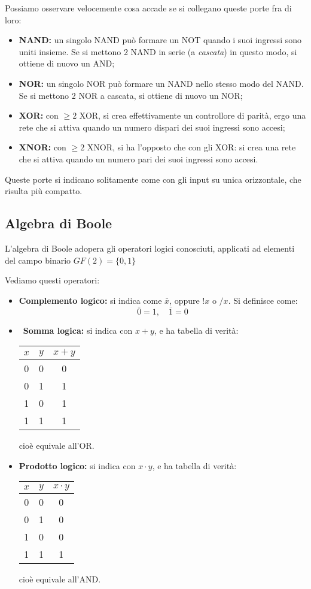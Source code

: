 \documentclass[a4paper,11pt]{article}
\begin{document}
Possiamo osservare velocemente cosa accade se si collegano queste porte fra di loro:
\begin{itemize}
	\item \textbf{NAND:} un singolo NAND può formare un NOT quando i suoi ingressi sono uniti insieme.
		Se si mettono 2 NAND in serie (a \textit{cascata}) in questo modo, si ottiene di nuovo un AND;
	\item \textbf{NOR:} un singolo NOR può formare un NAND nello stesso modo del NAND.
		Se si mettono 2 NOR a cascata, si ottiene di nuovo un NOR;
	\item \textbf{XOR:} con $\geq 2$ XOR, si crea effettivamente un controllore di parità, ergo una rete che si attiva quando un numero dispari dei suoi ingressi sono accesi;
	\item \textbf{XNOR:} con $\geq 2$ XNOR, si ha l'opposto che con gli XOR: si crea una rete che si attiva quando un numero pari dei suoi ingressi sono accesi.
\end{itemize}

Queste porte si indicano solitamente come con gli input su unica orizzontale, che risulta più compatto.

\subsection{Algebra di Boole}
L'algebra di Boole adopera gli operatori logici conosciuti, applicati ad elementi del campo binario $GF(2) = \{0 , 1\}$

Vediamo questi operatori:
\begin{itemize}
	\item \textbf{Complemento logico:} si indica come $\bar{x}$, oppure $!x$ o $/x$. 
		Si definisce come: $$ \bar{0} = 1, \quad \bar{1} = 0 $$
	\item\ \textbf{Somma logica:} si indica con $x + y$, e ha tabella di verità:
	\begin{table}[H]
		\center
		\begin{tabular} { c  c | c }
			$x$ & $y$ & $ x + y $ \\ 
			\hline 
			0 & 0 & 0 \\ 
			0 & 1 & 1 \\ 
			1 & 0 & 1 \\ 
			1 & 1 & 1 \\
		\end{tabular}
	\end{table}
		cioè equivale all'OR.
	\item \textbf{Prodotto logico:} si indica con $x \cdot y$, e ha tabella di verità:
	\begin{table}[H]
		\center
		\begin{tabular} { c  c | c }
			$x$ & $y$ & $ x \cdot y $ \\ 
			\hline 
			0 & 0 & 0 \\ 
			0 & 1 & 0 \\ 
			1 & 0 & 0 \\ 
			1 & 1 & 1 \\
		\end{tabular}
	\end{table}
		cioè equivale all'AND.

\end{itemize}
\end{document}
